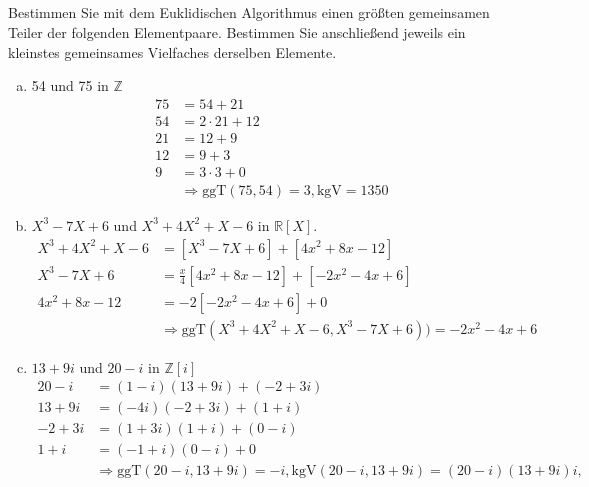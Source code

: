 \documentclass{article}
\newcommand{\Z}{\mathbb{Z}}
\newcommand{\R}{\mathbb{R}}
\newcommand{\ggT}{\text{ggT}}
\newcommand{\kgV}{\text{kgV}}
\begin{document}
\subsection{}
\color{blue}
Bestimmen Sie mit dem Euklidischen Algorithmus einen größten
gemeinsamen Teiler der folgenden Elementpaare. Bestimmen Sie
anschließend jeweils ein kleinstes gemeinsames Vielfaches
derselben Elemente.
\color{black}
\begin{enumerate}[(a)]
    \item
        \color{blue}
        54 und 75 in $\Z$\\
        \color{black}
        \begin{align*}
            75&=54+21\\
            54&=2\cdot 21+12\\
            21&=12+9\\
            12&=9+3\\
            9&=3\cdot 3+0\\
            &\Rightarrow\ggT(75,54)=3,\kgV=1350
        \end{align*}
    \item
        \color{blue}
        $X^3-7X+6$ und $X^3+4X^2+X-6$ in $\R[X]$.\\
        \color{black}
        \begin{align*}
        X^3+4X^2+X-6&=[X^3-7X+6]+[4x^2+8x-12]\\
        X^3-7X+6&=\frac{x}{4}[4x^2+8x-12]+[-2x^2-4x+6]\\
        4x^2+8x-12&=-2[-2x^2-4x+6]+0\\
        &\Rightarrow\ggT(X^3+4X^2+X-6,X^3-7X+6))=-2x^2-4x+6
        \end{align*}
    \item
        \color{blue}
        $13+9i$ und $20-i$ in $\Z[i]$\\
        \color{black}
        \begin{align*}
            20-i&=(1-i)(13+9i)+(-2+3i)\\
            13+9i&=(-4i)(-2+3i)+(1+i)\\
            -2+3i&=(1+3i)(1+i)+(0-i)\\
            1+i&=(-1+i)(0-i)+0\\
            &\Rightarrow\ggT(20-i,13+9i)=-i,
            \kgV(20-i,13+9i)=(20-i)(13+9i)i,\\
        \end{align*}
\end{enumerate}
\end{document}
